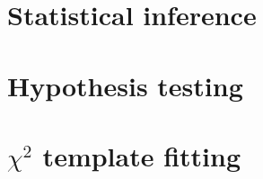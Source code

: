 \documentclass[../thesis.tex]{subfiles}
\begin{document}
\vspace{-1\baselineskip}

\section{Statistical inference}
\section{Hypothesis testing}
\section{$\chi^2$ template fitting}
\end{document}
